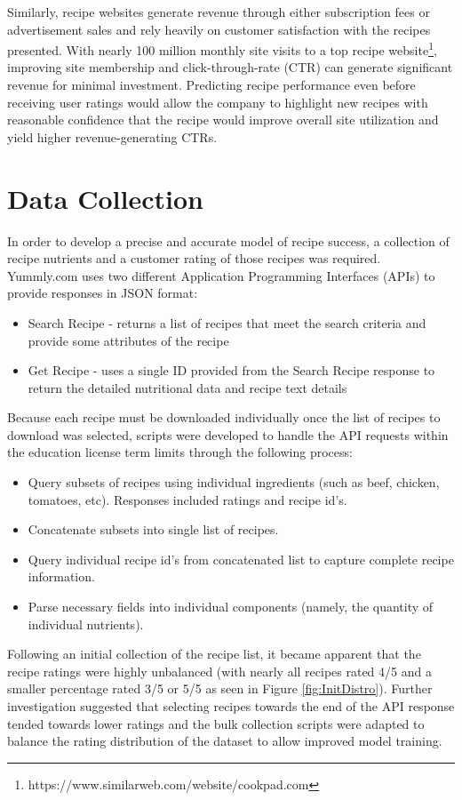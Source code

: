 \documentclass[]{scrartcl}
\begin{document}
Similarly, recipe websites generate revenue through either subscription fees or advertisement sales and rely heavily on customer satisfaction with the recipes presented.  With nearly 100 million monthly site visits to a top recipe website\footnote{https://www.similarweb.com/website/cookpad.com}, improving site membership and click-through-rate (CTR) can generate significant revenue for minimal investment.  Predicting recipe performance even before receiving user ratings would allow the company to highlight new recipes with reasonable confidence that the recipe would improve overall site utilization and yield higher revenue-generating CTRs.

\section*{Data Collection}
In order to develop a precise and accurate model of recipe success, a collection of recipe nutrients and a customer rating of those recipes was required.  Yummly.com uses two different Application Programming Interfaces (APIs) to provide responses in JSON format:
\begin{itemize}
	\item Search Recipe - returns a list of recipes that meet the search criteria and provide some attributes of the recipe  
	\item Get Recipe - uses a single ID provided from the Search Recipe response to return the detailed nutritional data and recipe text details
\end{itemize}   

Because each recipe must be downloaded individually once the list of recipes to download was selected, scripts were developed to handle the API requests within the education license term limits through the following process:
\begin{itemize}
	\item Query subsets of recipes using individual ingredients (such as beef, chicken, tomatoes, etc).  Responses included ratings and recipe id's.
	\item Concatenate subsets into single list of recipes.
	\item Query individual recipe id's from concatenated list to capture complete recipe information.
	\item Parse necessary fields into individual components (namely, the quantity of individual nutrients).
\end{itemize}

Following an initial collection of the recipe list, it became apparent that the recipe ratings were highly unbalanced (with nearly all recipes rated 4/5 and a smaller percentage rated 3/5 or 5/5 as seen in Figure \ref{fig:InitDistro}).  Further investigation suggested that selecting recipes towards the end of the API response tended towards lower ratings and the bulk collection scripts were adapted to balance the rating distribution of the dataset to allow improved model training.  
\end{document}
